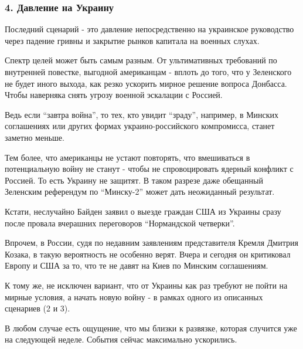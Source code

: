  
 
 
 
 

\subsubsection{4. Давление на Украину}
\label{sec:12_02_2022.stz.news.ua.strana.1.vojna_nachnetsja_15_fevralja.7.four}

Последний сценарий - это давление непосредственно на украинское руководство
через падение гривны и закрытие рынков капитала на военных слухах. 

Спектр целей может быть самым разным. От ультимативных требований по внутренней
повестке, выгодной американцам - вплоть до того, что у Зеленского не будет
иного выхода, как резко ускорить мирное решение вопроса Донбасса. Чтобы
наверняка снять угрозу военной эскалации с Россией. 

Ведь если \enquote{завтра война}, то тех, кто увидит \enquote{зраду}, например, в Минских
соглашениях или других формах украино-российского компромисса, станет заметно
меньше.

Тем более, что американцы не устают повторять, что вмешиваться в потенциальную
войну не станут - чтобы не спровоцировать ядерный конфликт с Россией. То есть
Украину не защитят. В таком разрезе даже обещанный Зеленским референдум по
\enquote{Минску-2} может дать неожиданный результат. 

Кстати, неслучайно Байден заявил о выезде граждан США из Украины сразу после
провала вчерашних переговоров \enquote{Нормандской четверки}. 

Впрочем, в России, судя по недавним заявлениям представителя Кремля Дмитрия
Козака, в такую вероятность не особенно верят. Вчера и сегодня он критиковал
Европу и США за то, что те не давят на Киев по Минским соглашениям. 

К тому же, не исключен вариант, что от Украины как раз требуют не пойти на
мирные условия, а начать новую войну - в рамках одного из описанных сценариев
(2 и 3). 

В любом случае есть ощущение, что мы близки к развязке, которая случится уже на
следующей неделе. События сейчас максимально ускорились.

